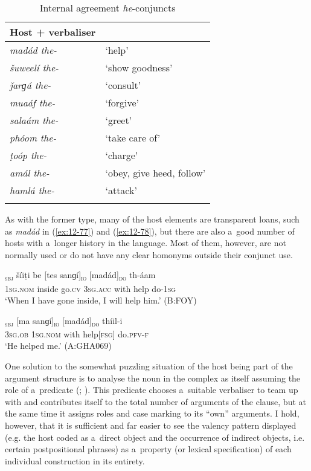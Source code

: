 \begin{table}[ht]
\caption{Internal agreement \textit{he}-conjuncts}
\begin{tabularx}{.75\textwidth}{ l@{\hspace{45pt}} Q} 
\lsptoprule
Host + verbaliser &
\\\hline
\textit{madád the-} &
`help'\\
\textit{šuweelí the-} &
`show goodness'\\
\textit{ǰarɡá the-} &
`consult'\\
\textit{muaáf the-} &
`forgive'\\
\textit{salaám the-} &
`greet'\\
\textit{phóom the-} &
`take care of'\\
\textit{ṭoóp the-} &
`charge'\\
\textit{amál the-} &
`obey, give heed, follow'\\
\textit{hamlá the-} &
`attack'\\\lspbottomrule
\end{tabularx}
\label{tab:12-4}
\end{table}


As with the former type, many of the host elements are transparent loans, such as \textit{madád} in (\ref{ex:12-77}) and (\ref{ex:12-78}), but there are also a~good number of hosts with a~longer history in the language. Most of them, however, are not normally used or do not have any clear homonyms outside their conjunct use.

\begin{exe}
\ex
\label{ex:12-77}
\gll [ma]\textsubscript{\textsc{sbj}} šíiṭi be [tes sanɡí]\textsubscript{\textsc{io}} [madád]\textsubscript{\textsc{do}} th-áam  \\
\textsc{1sg.nom} inside go.\textsc{cv} \textsc{3sg.acc} with help do-\textsc{1sg} \\
\glt `When I have gone inside, I will help him.' (B:FOY)
\end{exe}
\begin{exe}
\ex
\label{ex:12-78}
\gll [eetíi]\textsubscript{\textsc{sbj}} [ma sanɡí]\textsubscript{\textsc{io}} [madád]\textsubscript{\textsc{do}} thíil-i  \\
\textsc{3sg.ob} \textsc{1sg.nom} with help[\textsc{fsg]} do.\textsc{pfv-f}  \\
\glt `He helped me.' (A:GHA069)
\end{exe}

One solution to the somewhat puzzling situation of the host being part of the argument structure is to analyse the noun in the complex as itself assuming the role of a~predicate (\citealt[204--212]{verma1993}; \citealt[164--170]{mohanan1993}). This predicate chooses a~suitable verbaliser to team up with and contributes itself to the total number of arguments of the clause, but at the same time it assigns roles and case marking to its ``own'' arguments. I hold, however, that it is sufficient and far easier to see the valency pattern displayed (e.g. the host coded as a~direct object and the occurrence of indirect objects, i.e. certain postpositional phrases) as a~property (or lexical specification) of each individual construction in its entirety. 

